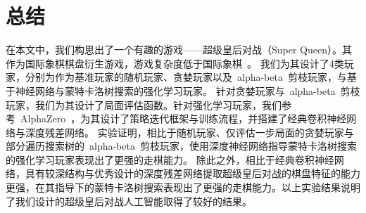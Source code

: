 \chapter{总结}
\label{chap:conclusion}
在本文中，我们构思出了一个有趣的游戏——超级皇后对战（Super Queen）。其作为国际象棋棋盘衍生游戏，游戏复杂度低于国际象棋~\cite{enwiki:complexity}。
我们为其设计了4类玩家，分别为作为基准玩家的随机玩家、贪婪玩家以及~alpha-beta~剪枝玩家，与基于神经网络与蒙特卡洛树搜索的强化学习玩家。
针对贪婪玩家与~alpha-beta~剪枝玩家，我们为其设计了局面评估函数。针对强化学习玩家，我们参考~AlphaZero~\cite{Silver1140,Silver2017,Silver2016}，为其设计了策略迭代框架与训练流程，并搭建了经典卷积神经网络与深度残差网络\cite{resnet}。
实验证明，相比于随机玩家、仅评估一步局面的贪婪玩家与部分遍历搜索树的~alpha-beta~剪枝玩家，使用深度神经网络指导蒙特卡洛树搜索的强化学习玩家表现出了更强的走棋能力。
除此之外，相比于经典卷积神经网络，具有较深结构与优秀设计的深度残差网络提取超级皇后对战的棋盘特征的能力更强，在其指导下的蒙特卡洛树搜索表现出了更强的走棋能力。以上实验结果说明了我们设计的超级皇后对战人工智能取得了较好的结果。